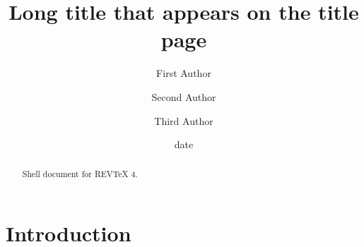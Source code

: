\documentclass[aps,preprint]{revtex4}%
\begin{document}
\title[Short title for running header]{Long title that appears on the title page}
\author{First Author}
\author{Second Author}
\author{Third Author}

\begin{abstract}
Shell document for REV\TeX{} 4.

\end{abstract}
\date[Date text]{date}




\maketitle
\tableofcontents


\section{Introduction}
\end{document}
